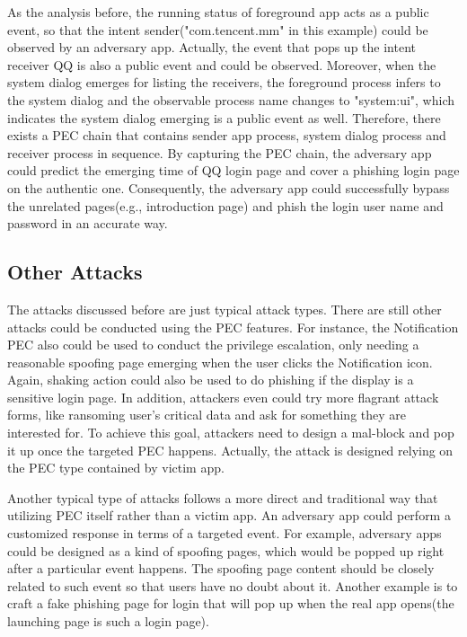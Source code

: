 \documentclass{sig-alternate-05-2015}
\begin{document}
As the analysis before, the running status of foreground app acts as a public event, so that the intent sender("com.tencent.mm" in this example) could be observed by an adversary app. Actually, the event that pops up the intent receiver QQ is also a public event and could be observed. Moreover, when the system dialog emerges for listing the receivers, the foreground process infers to the system dialog and the observable process name changes to "system:ui", which indicates the system dialog emerging is a public event as well. Therefore, there exists a PEC chain that contains sender app process, system dialog process and receiver process in sequence. By capturing the PEC chain, the adversary app could predict the emerging time of QQ login page and cover a phishing login page on the authentic one. Consequently, the adversary app could successfully bypass the unrelated pages(e.g., introduction page) and phish the login user name and password in an accurate way.

\subsection{Other Attacks}
The attacks discussed before are just typical attack types. There are still other attacks could be conducted using the PEC features. For instance, the Notification PEC also could be used to conduct the privilege escalation, only needing a reasonable spoofing page emerging when the user clicks the Notification icon. Again, shaking action could also be used to do phishing if the display is a sensitive login page. In addition, attackers even could try more flagrant attack forms, like ransoming user's critical data and ask for something they are interested for. To achieve this goal, attackers need to design a mal-block and pop it up once the targeted PEC happens. Actually, the attack is designed relying on the PEC type contained by victim app.

Another typical type of attacks follows a more direct and traditional way that utilizing PEC itself rather than a victim app. An adversary app could perform a customized response in terms of a targeted event. For example, adversary apps could be designed as a kind of spoofing pages, which would be popped up right after a particular event happens. The spoofing page content should be closely related to such event so that users have no doubt about it. Another example is to craft a fake phishing page for login that will pop up when the real app opens(the launching page is such a login page).
\end{document}
